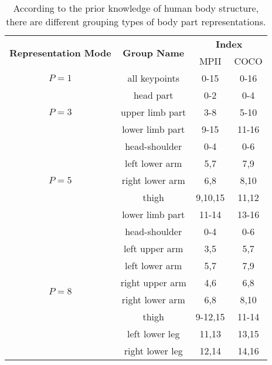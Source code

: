 \documentclass[journal]{IEEEtran}
\begin{document}
\begin{table}[h]
	\centering
	\caption{According to the prior knowledge of human body structure, there are different grouping types of body part representations.}
	\label{group}
	\renewcommand{\arraystretch}{1.1}
	\begin{tabular}{cccc}
		\toprule
		\multirow{2}{*}{\textbf{Representation Mode}}& \multirow{2}{*}{\textbf{Group Name}}&\multicolumn{2}{c}{\textbf{Index}}\\
	
		&&MPII&COCO\\
		\hline
		$P=1$&all keypoints&0-15&0-16\\
		\hline
		
		\multirow{3}{*}{$P=3$}& head part& 0-2  & 0-4\\
		
		& upper limb part&3-8 &5-10\\
		& lower limb part&9-15 &11-16\\
		\hline
		\multirow{5}{*}{$P=5$}& head-shoulder& 0-4&0-6\\
		&left lower arm&5,7&7,9\\
		&right lower arm &6,8&8,10\\
		&thigh&9,10,15&11,12\\
		& lower limb part&11-14 &13-16\\
		\hline
		
		\multirow{8}{*}{$P=8$}&head-shoulder&0-4&0-6\\
		&left upper arm&3,5&5,7\\
		&left lower arm&5,7&7,9\\
		&right upper arm&4,6&6,8\\
		
		&right lower arm &6,8&8,10\\
		&thigh&9-12,15&11-14\\
		&left lower leg &11,13&13,15\\
		&right lower leg&12,14&14,16\\
		\bottomrule
		
	\end{tabular}
	
	
\end{table}
\end{document}

